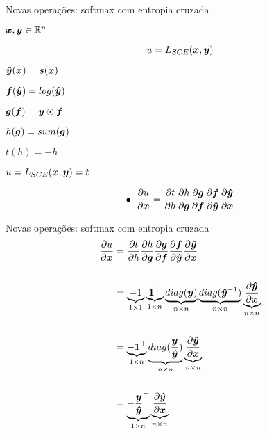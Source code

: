 \documentclass[10pt]{beamer}
\begin{document}
\begin{frame}{Novas operações: softmax com entropia cruzada}

$\bm{x}, \bm{y} \in \mathbb{R}^{n}$

\vspace{0.1 cm}

\begin{equation*}
u = L_{SCE}(\bm{x}, \bm{y})
\end{equation*}

$\bm{\hat{y}}(\bm{x}) = \bm{s}(\bm{x})$

$\bm{f}(\bm{\hat{y}}) = log(\bm{\hat{y}})$

$\bm{g}(\bm{f}) = \bm{y} \odot \bm{f}$

$h(\bm{g}) = sum(\bm{g})$

$t(h) = -h$


$u = L_{SCE}(\bm{x}, \bm{y}) = t$

\vspace{0.1 cm}
\begin{align*}
\bullet \; \; \frac{\partial u}{\partial \bm{x}} &= \frac{\partial t}{\partial h} \frac{\partial h}{\partial \bm{g}}\frac{\partial \bm{g}}{\partial \bm{f}}\frac{\partial \bm{f}}{\partial \bm{\hat{y}}}\frac{\partial \bm{\hat{y}}}{\partial \bm{x}}\\
\end{align*}

\end{frame}

\begin{frame}{Novas operações: softmax com entropia cruzada}
\begin{align*}
\frac{\partial u}{\partial \bm{x}} &= \frac{\partial t}{\partial h} \frac{\partial h}{\partial \bm{g}}\frac{\partial \bm{g}}{\partial \bm{f}}\frac{\partial \bm{f}}{\partial \bm{\hat{y}}}\frac{\partial \bm{\hat{y}}}{\partial \bm{x}}\\
&\\
&= \underbrace{-1}_{\tiny{1 \times 1}} \underbrace{\bm{1}^{\top}}_{\tiny{1 \times n}} \underbrace{diag(\bm{y})}_{\tiny{n \times n}} \underbrace{diag(\bm{\hat{y}}^{-1})}_{\tiny{n \times n}} \underbrace{\frac{\partial \bm{\hat{y}}}{\partial \bm{x}}}_{\tiny{n \times n}}\\
&\\
&= \underbrace{-\bm{1}^{\top}}_{\tiny{1 \times n}} \underbrace{diag(\frac{\bm{y}}{\bm{\hat{y}}})}_{\tiny{n \times n}}\underbrace{\frac{\partial \bm{\hat{y}}}{\partial \bm{x}}}_{\tiny{n \times n}}\\
&\\
&=  \underbrace{-\frac{\bm{y}}{\bm{\hat{y}}}^{\top}}_{\tiny{1 \times n}} \underbrace{\frac{\partial \bm{\hat{y}}}{\partial \bm{x}}}_{\tiny{n \times n}}\\
\end{align*}

\end{frame}
\end{document}
